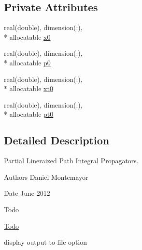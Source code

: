 \subsection*{Private Attributes}
\begin{DoxyCompactItemize}
\item 
real(double), dimension(\+:), \\*
allocatable \hyperlink{classpldm__class_a66ae11e24219b080698059a797561bb4}{x0}
\item 
real(double), dimension(\+:), \\*
allocatable \hyperlink{classpldm__class_a4da9c01c7e463087a5f38764804dd0eb}{p0}
\item 
real(double), dimension(\+:), \\*
allocatable \hyperlink{classpldm__class_a2f8d09296fcb6d486fb5a87e5a13276b}{xt0}
\item 
real(double), dimension(\+:), \\*
allocatable \hyperlink{classpldm__class_a6f0729e807a28fab99053667439c375c}{pt0}
\end{DoxyCompactItemize}


\subsection{Detailed Description}
Partial Lineraized Path Integral Propagators. 

\begin{DoxyAuthor}{Authors}
Daniel Montemayor 
\end{DoxyAuthor}
\begin{DoxyDate}{Date}
June 2012 
\end{DoxyDate}
\begin{DoxyRefDesc}{Todo}
\item[\hyperlink{todo__todo000006}{Todo}]
\begin{DoxyItemize}
\item display output to file option 
\end{DoxyItemize}\end{DoxyRefDesc}


